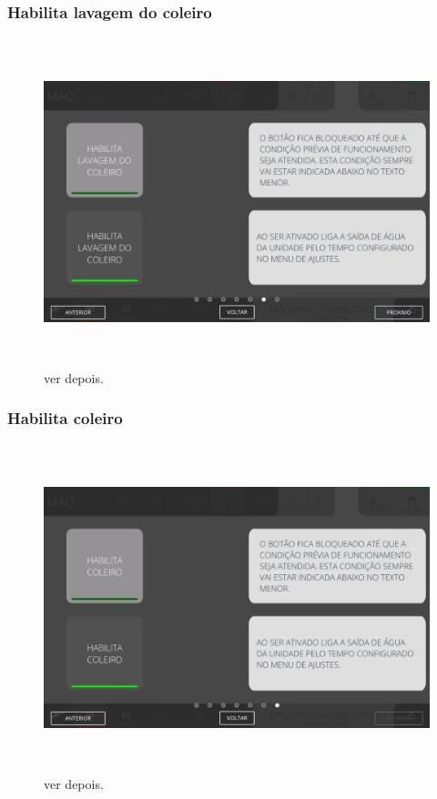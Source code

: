 \newpage
\thispagestyle{fancy}
\vspace*{\fill}
\subsubsection{\small{Habilita lavagem do coleiro}}
\begin{figure}[h]
  \centering
  \includegraphics[width=576px,height=360px]{src/images/07-fold/commands/e-6.png}
  \caption{ver depois.}
   \label{}
\end{figure}
\vspace*{\fill}

\newpage
\thispagestyle{fancy}
\vspace*{\fill}
\subsubsection{\small{Habilita coleiro}}
\begin{figure}[h]
  \centering
  \includegraphics[width=576px,height=360px]{src/images/07-fold/commands/e-7.png}
  \caption{ver depois.}
   \label{}
\end{figure}
\vspace*{\fill}